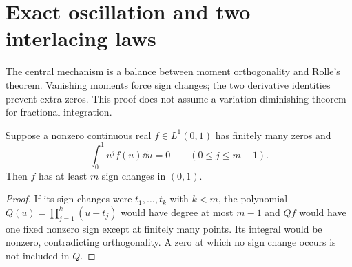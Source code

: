 \section{Exact oscillation and two interlacing laws}
\label{ado:sec:oscillation}
The central mechanism is a balance between moment orthogonality and
Rolle's theorem. Vanishing moments force sign changes; the two derivative
identities prevent extra zeros. This proof does not assume a
variation-diminishing theorem for fractional integration.

\begin{lemma}
\label{ado:lem:momentchanges}
Suppose a nonzero continuous real $f\in L^1(0,1)$ has finitely many
zeros and
\[
 \int_0^1u^j f(u)\dd u=0\qquad(0\le j\le m-1).
\]
Then $f$ has at least $m$ sign changes in $(0,1)$.
\end{lemma}
\begin{proof}
If its sign changes were $t_1,\ldots,t_k$ with $k<m$, the polynomial
$Q(u)=\prod_{j=1}^k(u-t_j)$ would have degree at most $m-1$ and
$Qf$ would have one fixed nonzero sign except at finitely many points.
Its integral would be nonzero, contradicting orthogonality. A zero at
which no sign change occurs is not included in $Q$.
\end{proof}

